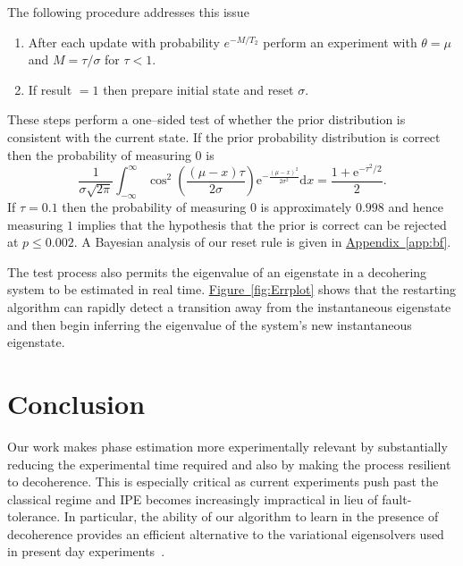\documentclass[aps,pra,amsmath,twocolumn,amssymb,superscriptaddress]{revtex4-1}
\newcommand{\app}[1]{\hyperref[app:#1]{Appendix~\ref*{app:#1}}}
\newcommand{\fig}[1]{\hyperref[fig:#1]{Figure~\ref*{fig:#1}}}
\newcommand{\ee}{\mathrm{e}}
\begin{document}
{The following procedure addresses this issue%
\begin{enumerate}
\item After each update with probability $e^{-M/T_2}$ perform an experiment with $\theta=\mu$ and $M=\tau/\sigma$ for $\tau< 1$.
\item If result $=1$ then prepare initial state and reset $\sigma$.
\end{enumerate}

These steps perform a one--sided test of whether the prior distribution is consistent with the current state.
If the prior probability distribution is correct then the probability of measuring $0$ is
\begin{equation}
    \frac{1}{\sigma\sqrt{2\pi}}\int_{-\infty}^\infty \cos^2\left(\frac{(\mu-x)\tau}{2\sigma}\right)\ee^{-\frac{(\mu-x)^2}{2\sigma^2}} \mathrm{d}x = \frac{1+\ee^{-\tau^2/2}}{2}.
\end{equation}
If $\tau=0.1$ then the probability of measuring $0$ is approximately $0.998$ and hence measuring $1$ implies that the hypothesis that the prior is correct can be rejected at $p \le 0.002$. A Bayesian analysis of our reset rule
is given in \app{bf}.


The test process also permits the eigenvalue of an eigenstate in a decohering system to be estimated in real time. \fig{Errplot} shows that the restarting algorithm can rapidly detect a transition away from the instantaneous eigenstate and then begin inferring the eigenvalue of the system's new instantaneous eigenstate.  

\section{Conclusion}

Our work makes phase estimation more
experimentally relevant by substantially reducing the
experimental time required and also by making the process resilient
to decoherence. This is especially critical as current experiments push past the classical
regime and IPE becomes increasingly impractical in lieu of fault-tolerance.
In particular, the ability of our algorithm to learn in the presence of decoherence provides an efficient alternative to the
variational eigensolvers used in present day experiments~\cite{PMS+14,MBL+14,WHT15}.  

}
\end{document}
